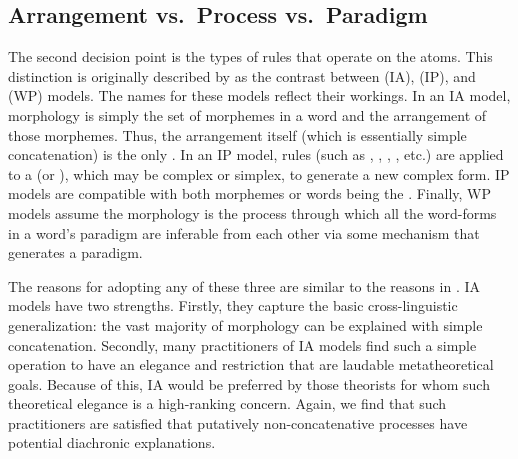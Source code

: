 \documentclass[output=paper,hidelinks]{langscibook}
\begin{document}
\subsection{Arrangement vs.\  Process vs.\  Paradigm}
\label{sec:Morph:ia-vs-ip-vs-wp}

The second decision point is the types of rules that operate on the
atoms.  This distinction is originally described by \citet{hockett54}
as the contrast between  (IA),
 (IP), and  (WP)
models.  The names for these models reflect their workings. In an IA
model, morphology is simply the set of morphemes in a word and the
arrangement of those morphemes.  Thus, the arrangement itself (which
is essentially simple concatenation) is the only .  In an IP model, rules (such as ,
, , ,
etc.) are applied to a  (or ), which may be
complex or simplex, to generate a new complex form.  IP models are
compatible with both morphemes or words being the .
Finally, WP models assume the morphology is the process through which
all the word-forms in a word’s paradigm are inferable from each other
via some mechanism that generates a paradigm.

The reasons for adopting any of these three are similar to the reasons
in .  IA models have two
strengths.  Firstly, they capture the basic cross-linguistic generalization:
the vast majority of morphology can be explained with simple
concatenation.  Secondly, many practitioners of IA models
find such a simple operation to have an elegance and restriction that
are laudable metatheoretical goals.  Because of this, IA would be
preferred by those theorists for whom such theoretical elegance is a
high-ranking concern.  Again, we find that such practitioners are
satisfied that putatively non-concatenative processes have
potential diachronic explanations.
\end{document}
